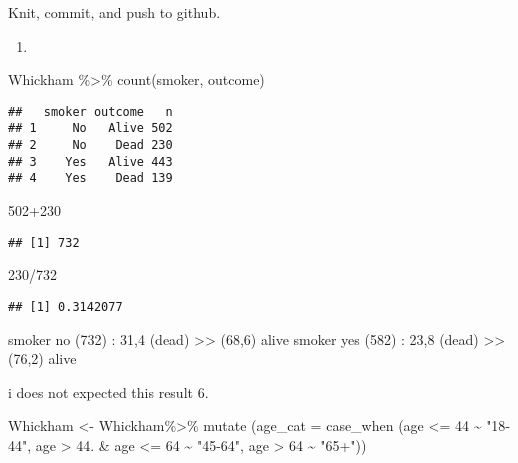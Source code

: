 \documentclass[
]{article}
\newenvironment{Shaded}{\begin{snugshade}}{\end{snugshade}}
\newcommand{\AttributeTok}[1]{\textcolor[rgb]{0.77,0.63,0.00}{#1}}
\newcommand{\DecValTok}[1]{\textcolor[rgb]{0.00,0.00,0.81}{#1}}
\newcommand{\FloatTok}[1]{\textcolor[rgb]{0.00,0.00,0.81}{#1}}
\newcommand{\FunctionTok}[1]{\textcolor[rgb]{0.00,0.00,0.00}{#1}}
\newcommand{\NormalTok}[1]{#1}
\newcommand{\OtherTok}[1]{\textcolor[rgb]{0.56,0.35,0.01}{#1}}
\newcommand{\SpecialCharTok}[1]{\textcolor[rgb]{0.00,0.00,0.00}{#1}}
\newcommand{\StringTok}[1]{\textcolor[rgb]{0.31,0.60,0.02}{#1}}
\providecommand{\tightlist}{%
  \setlength{\itemsep}{0pt}\setlength{\parskip}{0pt}}
\begin{document}
Knit, commit, and push to github.

\begin{enumerate}
\def\labelenumi{\arabic{enumi}.}
\setcounter{enumi}{4}
\tightlist
\item
\end{enumerate}

\begin{Shaded}
\begin{Highlighting}[]
\NormalTok{Whickham }\SpecialCharTok{\%\textgreater{}\%}
  \FunctionTok{count}\NormalTok{(smoker, outcome)}
\end{Highlighting}
\end{Shaded}

\begin{verbatim}
##   smoker outcome   n
## 1     No   Alive 502
## 2     No    Dead 230
## 3    Yes   Alive 443
## 4    Yes    Dead 139
\end{verbatim}

\begin{Shaded}
\begin{Highlighting}[]
\DecValTok{502}\SpecialCharTok{+}\DecValTok{230}
\end{Highlighting}
\end{Shaded}

\begin{verbatim}
## [1] 732
\end{verbatim}

\begin{Shaded}
\begin{Highlighting}[]
 \DecValTok{230}\SpecialCharTok{/}\DecValTok{732}
\end{Highlighting}
\end{Shaded}

\begin{verbatim}
## [1] 0.3142077
\end{verbatim}

smoker no (732) : 31,4 (dead) \textgreater\textgreater{} (68,6) alive
smoker yes (582) : 23,8 (dead) \textgreater\textgreater{} (76,2) alive

i does not expected this result 6.

\begin{Shaded}
\begin{Highlighting}[]
\NormalTok{Whickham }\OtherTok{\textless{}{-}}\NormalTok{ Whickham}\SpecialCharTok{\%\textgreater{}\%} \FunctionTok{mutate}\NormalTok{ (}\AttributeTok{age\_cat =} \FunctionTok{case\_when}\NormalTok{ (age }\SpecialCharTok{\textless{}=} \DecValTok{44} \SpecialCharTok{\textasciitilde{}} \StringTok{"18{-}44"}\NormalTok{, age }\SpecialCharTok{\textgreater{}} \FloatTok{44.} \SpecialCharTok{\&}\NormalTok{ age }\SpecialCharTok{\textless{}=} \DecValTok{64} \SpecialCharTok{\textasciitilde{}} \StringTok{"45{-}64"}\NormalTok{, age }\SpecialCharTok{\textgreater{}} \DecValTok{64} \SpecialCharTok{\textasciitilde{}} \StringTok{"65+"}\NormalTok{))}
\end{Highlighting}
\end{Shaded}
\end{document}
